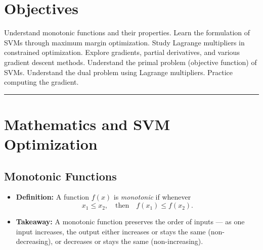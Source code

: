 
\section*{Objectives}
\begin{outline}
    \1 Understand monotonic functions and their properties.
    \1 Learn the formulation of SVMs through maximum margin optimization.
    \1 Study Lagrange multipliers in constrained optimization.
    \1 Explore gradients, partial derivatives, and various gradient descent methods.
    \1 Understand the primal problem (objective function) of SVMs.
    \1 Understand the dual problem using Lagrange multipliers.
    \1 Practice computing the gradient.
\end{outline}

\rule[0.0051in]{\textwidth}{0.00025in}

\section{Mathematics and SVM Optimization}

\subsection{Monotonic Functions}
\begin{itemize}
    \item \textbf{Definition:} A function \( f(x) \) is \emph{monotonic} if whenever 
    \[
    x_1 \leq x_2, \quad \text{then} \quad f(x_1) \leq f(x_2).
    \]
    \item \textbf{Takeaway:} A monotonic function preserves the order of inputs — as one input increases, the output either increases or stays the same (non-decreasing), or decreases or stays the same (non-increasing).
\end{itemize}


